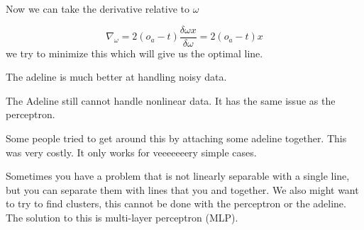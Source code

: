 \documentclass{article}
\begin{document}
Now we can take the derivative relative to $\omega$

\[
	\nabla_\omega = 2(o_a - t)\frac{\delta\omega x}{\delta\omega}
	=  2(o_a - t)x
\]
we try to minimize this which will give us the optimal line.


The adeline is much better at handling noisy data.


The Adeline still cannot handle nonlinear data. It has the same issue as the perceptron.

Some people tried to get around this by attaching some adeline together. This was very costly. It only works for veeeeeeery simple cases.


Sometimes you have a problem that is not linearly separable with a single line, but you can separate them with lines that you and together. We also might want to try to find clusters, this cannot be done with the perceptron or the adeline. The solution to this is multi-layer perceptron (MLP).


\end{document}
